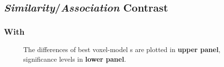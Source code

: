 


\subsection{\emph{Similarity}/\emph{Association} Contrast}

\subsubsection{ With }

\begin{figure}
    \centering
    \caption[- Contrast, Group]{The differences of best voxel-model s are plotted in \textbf{upper panel}, significance levels in \textbf{lower panel}.} 
    \label{fig:EMB_SIM_ASN_ContrastMapG}
\end{figure}

